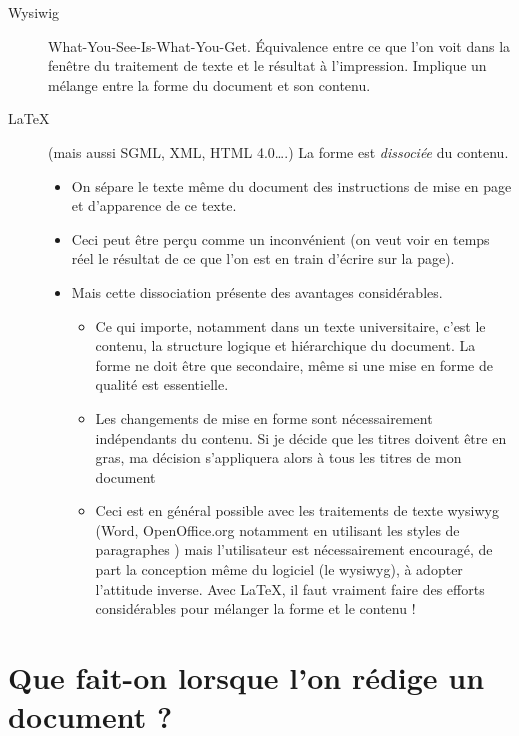 \begin{description}
\item[Wysiwig] What-You-See-Is-What-You-Get. \'Equivalence entre ce
  que l'on voit dans la fenêtre du traitement de texte et le résultat
  à l'impression. Implique un mélange entre la forme du document et
  son contenu.
\item[\LaTeX] (mais aussi SGML, XML, HTML 4.0\ldots.) La forme est
  \emph{dissociée} du contenu.
  \begin{itemize}
  \item On sépare le texte même du document des instructions de mise
    en page et d'apparence de ce texte.
  \item Ceci peut être perçu comme un inconvénient (on veut voir en
    temps réel le résultat de ce que l'on est en train d'écrire sur la
    page).
  \item Mais cette dissociation présente des avantages considérables.
    \begin{itemize}
    \item Ce qui importe, notamment dans un texte universitaire, c'est
      le contenu, la structure logique et hiérarchique du document. La
      forme ne doit être que secondaire, même si une mise en forme de
      qualité est essentielle.
    \item Les changements de mise en forme sont nécessairement
      indépendants du contenu. Si je décide que les titres doivent
      être en gras, ma décision s'appliquera alors à tous les titres
      de mon document
    \item Ceci est en général possible avec les traitements de texte
      wysiwyg (Word, OpenOffice.org notamment en utilisant les \og
      styles de paragraphes \fg) mais l'utilisateur est nécessairement
      encouragé, de part la conception même du logiciel (le wysiwyg),
      à adopter l'attitude inverse. Avec \LaTeX, il faut vraiment
      faire des efforts considérables pour mélanger la forme et le
      contenu !
    \end{itemize}
  \end{itemize}
\end{description}


\section{Que fait-on lorsque l'on rédige un document ?}

